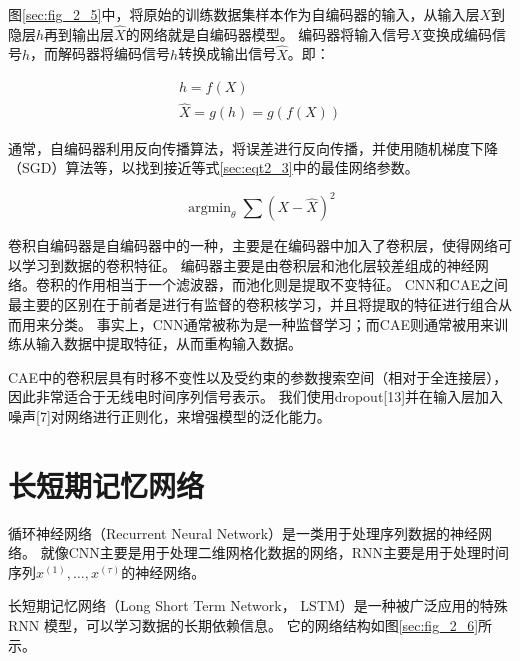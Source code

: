 图\ref{sec:fig_2_5}中，将原始的训练数据集样本作为自编码器的输入，从输入层$X$到隐层$h$再到输出层$\hat{X}$的网络就是自编码器模型。
编码器将输入信号$X$变换成编码信号$h$，而解码器将编码信号$h$转换成输出信号$\hat{X}$。即：\par

\begin{equation}
	\begin{gathered}
		h=f(X)
		\\
		\hat{X}=g(h)=g(f(X))
	\end{gathered}
\end{equation}

通常，自编码器利用反向传播算法，将误差进行反向传播，并使用随机梯度下降（SGD）算法等，以找到接近等式\ref{sec:eqt2_3}中的最佳网络参数。\par
\begin{equation}\label{sec:eqt2_3}
\mathop{\arg\min}_{\theta} \sum(X − \hat{X})^2
\end{equation}

卷积自编码器是自编码器中的一种，主要是在编码器中加入了卷积层，使得网络可以学习到数据的卷积特征。
编码器主要是由卷积层和池化层较差组成的神经网络。卷积的作用相当于一个滤波器，而池化则是提取不变特征。
CNN和CAE之间最主要的区别在于前者是进行有监督的卷积核学习，并且将提取的特征进行组合从而用来分类。
事实上，CNN通常被称为是一种监督学习；而CAE则通常被用来训练从输入数据中提取特征，从而重构输入数据。\par

CAE中的卷积层具有时移不变性以及受约束的参数搜索空间（相对于全连接层），因此非常适合于无线电时间序列信号表示。
我们使用dropout[13]并在输入层加入噪声[7]对网络进行正则化，来增强模型的泛化能力。\par

\section{长短期记忆网络}

循环神经网络（Recurrent Neural Network）是一类用于处理序列数据的神经网络。
就像CNN主要是用于处理二维网格化数据的网络，RNN主要是用于处理时间序列$x^{(1)}, \dots, x^{(\tau)}$的神经网络。\par

长短期记忆网络（Long Short Term Network， LSTM）是一种被广泛应用的特殊 RNN 模型，可以学习数据的长期依赖信息。
它的网络结构如图\ref{sec:fig_2_6}所示。\par

